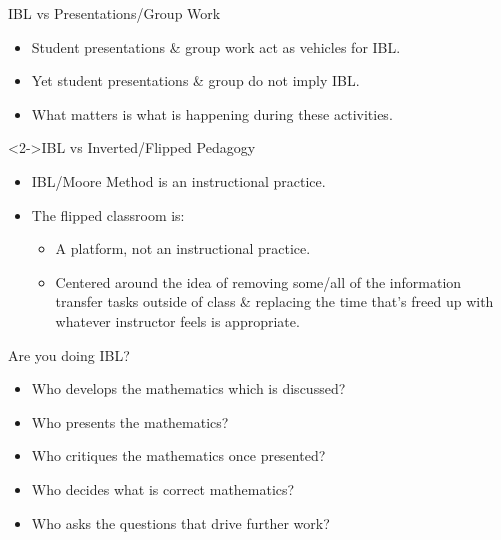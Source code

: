 \documentclass[10pt]{beamer}
\begin{document}

%
%
%


\begin{frame}

\begin{block}{IBL vs Presentations/Group Work}
\begin{itemize}
\item Student presentations \& group work act as vehicles for IBL. 
\item Yet student presentations \& group do not imply IBL. 
\item What matters is what is happening during these activities.
\end{itemize}
\end{block}

\begin{block}<2->{IBL vs Inverted/Flipped Pedagogy}
\begin{itemize}
\item<2-> IBL/Moore Method is an instructional practice.
\item<2-> The flipped classroom is:
    \begin{itemize}\normalsize
    \item<2-> A platform, not an instructional practice. 
    \item<2-> Centered around the idea of removing some/all of the information transfer tasks outside of class \& replacing the time that's freed up with whatever instructor feels is appropriate.
    \end{itemize}
\end{itemize}
\end{block}

\end{frame}


\begin{frame}

\begin{block}{Are you doing IBL?}
\begin{itemize}
\item<2-> Who develops the mathematics which is discussed?
\item<3-> Who presents the mathematics?
\item<4-> Who critiques the mathematics once presented?
\item<5-> Who decides what is correct mathematics?
\item<6-> Who asks the questions that drive further work?
\end{itemize}
\end{block}

\end{frame}

\end{document}
